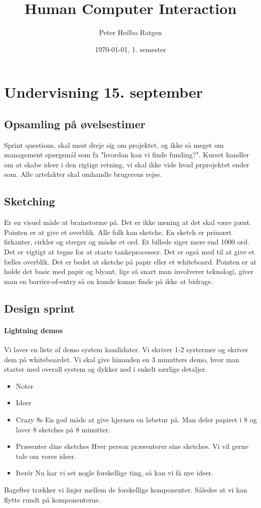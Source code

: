 \documentclass{article}
\title{Human Computer Interaction}
\author{Peter Heilbo Ratgen}
\date{\today, 1. semester}
\begin{document}
\maketitle

\section{Undervisning 15. september}
\subsection{Opsamling på øvelsestimer} 
Sprint questions, skal mest dreje sig om projektet, og ikke så meget om
management spørgsmål som fx "hvordan kan vi finde funding?".
Kurset handler om at skabe ideer i den rigtige retning, vi skal ikke vide hvad
prprojektet ender som. Alle artefakter skal omhandle brugerens rejse.

\subsection{Sketching}
Er en visuel måde at brainstorme på. Det er ikke mening at det skal være pænt.
Pointen er at give et overblik. Alle folk kan sketche. En sketch er primært
firkanter, cirkler og streger og måske et ord. Et billede siger mere end 1000
ord. 
Det er vigtigt at tegne for at starte tankeprocesser. Det er også med til at
give et fælles overblik. Det er bedst at sketche på papir eller et whiteboard.
Pointen er at holde det basic med papir og blyant, lige så snart man involverer
teknologi, giver man en barrier-of-entry så en kunde kunne finde på ikke at
bidrage.

\subsection{Design sprint}
\paragraph{Lightning demos} Vi laver en liste af demo system kandidater. Vi
skriver 1-2 systermer og skriver dem på whiteboardet. Vi skal give hinanden en 3
minutters demo, hvor man starter med overall system og dykker ned i enkelt
særlige detaljer.

\begin{itemize}
  \item Noter
  \item Ideer
  \item Crazy 8s
    \subitem En god måde at give hjernen en løbetur på. Man deler papiret i 8 og
    laver 8 sketches på 8 minutter.
  \item Præsenter dine sketches
    \subitem Hver person præsenterer sine sketches. Vi vil gerne tale om vores
    ideer.
  \item Iterér 
    \subitem Nu har vi set nogle forskellige ting, så kan vi få nye ideer.
\end{itemize}

Bagefter trækker vi linjer mellem de forskellige komponenter. Således at vi kan
flytte rundt på komponenterne.
\end{document}
